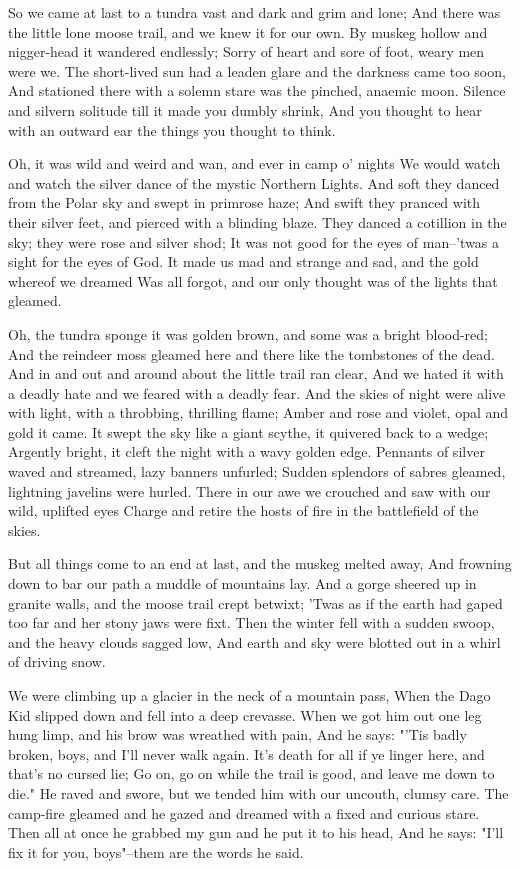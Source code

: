 \begin{poemblock}
 So we came at last to a tundra vast and dark and grim and lone;
 And there was the little lone moose trail, and we knew it for our own.
 By muskeg hollow and nigger-head it wandered endlessly;
 Sorry of heart and sore of foot, weary men were we.
 The short-lived sun had a leaden glare and the darkness came too soon,
 And stationed there with a solemn stare was the pinched, anaemic moon.
 Silence and silvern solitude till it made you dumbly shrink,
 And you thought to hear with an outward ear
   the things you thought to think.

 Oh, it was wild and weird and wan, and ever in camp o' nights
 We would watch and watch the silver dance of the mystic Northern Lights.
 And soft they danced from the Polar sky and swept in primrose haze;
 And swift they pranced with their silver feet,
   and pierced with a blinding blaze.
 They danced a cotillion in the sky; they were rose and silver shod;
 It was not good for the eyes of man--'twas a sight for the eyes of God.
 It made us mad and strange and sad, and the gold whereof we dreamed
 Was all forgot, and our only thought was of the lights that gleamed.

 Oh, the tundra sponge it was golden brown, and some was a bright blood-red;
 And the reindeer moss gleamed here and there
   like the tombstones of the dead.
 And in and out and around about the little trail ran clear,
 And we hated it with a deadly hate and we feared with a deadly fear.
 And the skies of night were alive with light,
   with a throbbing, thrilling flame;
 Amber and rose and violet, opal and gold it came.
 It swept the sky like a giant scythe, it quivered back to a wedge;
 Argently bright, it cleft the night with a wavy golden edge.
 Pennants of silver waved and streamed, lazy banners unfurled;
 Sudden splendors of sabres gleamed, lightning javelins were hurled.
 There in our awe we crouched and saw with our wild, uplifted eyes
 Charge and retire the hosts of fire in the battlefield of the skies.

 But all things come to an end at last, and the muskeg melted away,
 And frowning down to bar our path a muddle of mountains lay.
 And a gorge sheered up in granite walls, and the moose trail crept betwixt;
 'Twas as if the earth had gaped too far and her stony jaws were fixt.
 Then the winter fell with a sudden swoop, and the heavy clouds sagged low,
 And earth and sky were blotted out in a whirl of driving snow.

 We were climbing up a glacier in the neck of a mountain pass,
 When the Dago Kid slipped down and fell into a deep crevasse.
 When we got him out one leg hung limp, and his brow was wreathed with pain,
 And he says:  "'Tis badly broken, boys, and I'll never walk again.
 It's death for all if ye linger here, and that's no cursed lie;
 Go on, go on while the trail is good, and leave me down to die."
 He raved and swore, but we tended him with our uncouth, clumsy care.
 The camp-fire gleamed and he gazed and dreamed
   with a fixed and curious stare.
 Then all at once he grabbed my gun and he put it to his head,
 And he says:  "I'll fix it for you, boys"--them are the words he said.


\end{poemblock}

